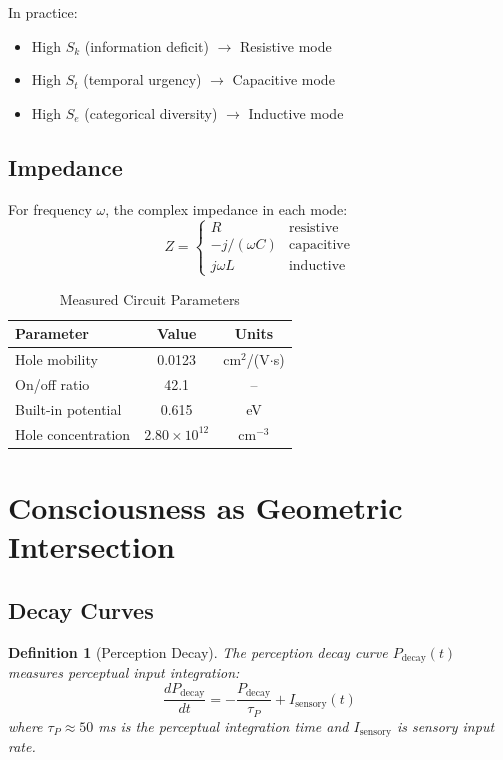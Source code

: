 \documentclass[twocolumn,amsmath,amssymb,aps,prl,superscriptaddress]{revtex4-2}
\newtheorem{definition}[theorem]{Definition}
\newcommand{\Sk}{S_k}
\newcommand{\St}{S_t}
\newcommand{\Se}{S_e}
\newcommand{\Pdecay}{P_{\text{decay}}}
\begin{document}
In practice:
\begin{itemize}
\item High $\Sk$ (information deficit) $\to$ Resistive mode
\item High $\St$ (temporal urgency) $\to$ Capacitive mode
\item High $\Se$ (categorical diversity) $\to$ Inductive mode
\end{itemize}

\subsection{Impedance}

For frequency $\omega$, the complex impedance in each mode:
\begin{equation}
Z = \begin{cases}
R & \text{resistive} \\
-j/(\omega C) & \text{capacitive} \\
j\omega L & \text{inductive}
\end{cases}
\end{equation}

\begin{table}[h]
\centering
\caption{Measured Circuit Parameters}
\begin{tabular}{lcc}
\toprule
Parameter & Value & Units \\
\midrule
Hole mobility & 0.0123 & cm$^2$/(V$\cdot$s) \\
On/off ratio & 42.1 & -- \\
Built-in potential & 0.615 & eV \\
Hole concentration & $2.80 \times 10^{12}$ & cm$^{-3}$ \\
\bottomrule
\end{tabular}
\end{table}

\section{Consciousness as Geometric Intersection}
\label{sec:consciousness}

\subsection{Decay Curves}

\begin{definition}[Perception Decay]
The perception decay curve $\Pdecay(t)$ measures perceptual input integration:
\begin{equation}
\frac{d\Pdecay}{dt} = -\frac{\Pdecay}{\tau_P} + I_{\text{sensory}}(t)
\end{equation}
where $\tau_P \approx 50$ ms is the perceptual integration time and $I_{\text{sensory}}$ is sensory input rate.
\end{definition}
\end{document}
